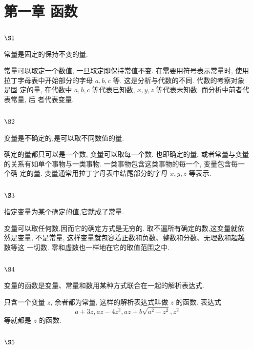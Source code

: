 \chapter{第一章 函数}

\section{$\S 1$}

常量是固定的保持不变的量.

常量可以取定一个数值, 一旦取定即保持常值不变. 在需要用符号表示常量时, 使用 拉丁字母表中开始部分的字母 $a, b, c$ 等. 这是分析与代数的不同. 代数的考察对象是固 定的量, 在代数中 $a, b, c$ 等代表已知数, $x, y, z$ 等代表末知数. 而分析中前者代表常量, 后 者代表变量.

\section{$\S 2$}

变量是不确定的,是可以取不同数值的量.

确定的量都只可以是一个数, 变量可以取每一个数. 也即确定的量, 或者常量与变量 的关系有如单个事物与一类事物. 一类事物包含这类事物的每一个, 变量包含每一个确 定的量. 变量通常用拉丁字母表中结尾部分的字母 $x, y, z$ 等表示.

\section{$\S 3$}

指定变量为某个确定的值,它就成了常量.

变量可以取任何数,因而它的确定方式是无穷的. 取不遍所有确定的数,这变量就依 然是变量, 不是常量, 这样变量就包容着正数和负数、整数和分数、无理数和超越数等这 一切数. 零和虚数也一样地在它的取值范围之中.

\section{$\S 4$}

变量的函数是变量、常量和数用某种方式联合在一起的解析表达式.

只含一个变量 $z$, 余者都为常量, 这样的解析表达式叫做 $z$ 的函数. 表达式
\[
a+3 z, a z-4 z^{2}, a z+b \sqrt{a^{2}-z^{2}}, z^{2}
\]
等就都是 $z$ 的函数. 

\section{$\S 5$}

